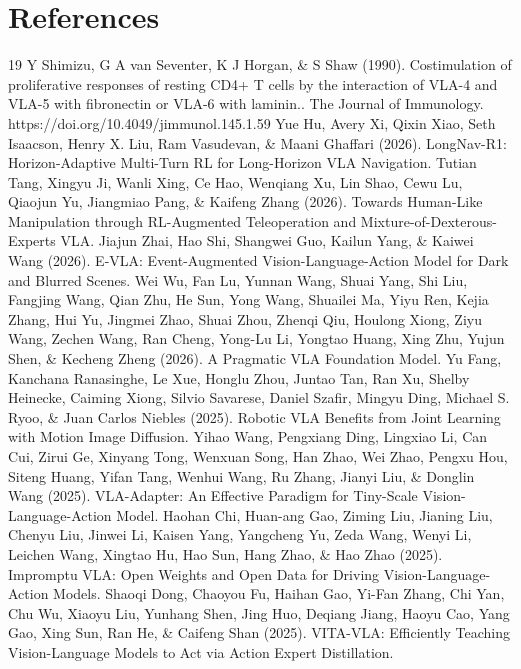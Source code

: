 \documentclass{article}
\begin{document}
\section*{References}
\begin{thebibliography}{19}
 Y Shimizu, G A van Seventer, K J Horgan, \& S Shaw (1990). Costimulation of proliferative responses of resting CD4+ T cells by the interaction of VLA-4 and VLA-5 with fibronectin or VLA-6 with laminin.. The Journal of Immunology. https://doi.org/10.4049/jimmunol.145.1.59
 Yue Hu, Avery Xi, Qixin Xiao, Seth Isaacson, Henry X. Liu, Ram Vasudevan, \& Maani Ghaffari (2026). LongNav-R1: Horizon-Adaptive Multi-Turn RL for Long-Horizon VLA Navigation.
 Tutian Tang, Xingyu Ji, Wanli Xing, Ce Hao, Wenqiang Xu, Lin Shao, Cewu Lu, Qiaojun Yu, Jiangmiao Pang, \& Kaifeng Zhang (2026). Towards Human-Like Manipulation through RL-Augmented Teleoperation and Mixture-of-Dexterous-Experts VLA.
 Jiajun Zhai, Hao Shi, Shangwei Guo, Kailun Yang, \& Kaiwei Wang (2026). E-VLA: Event-Augmented Vision-Language-Action Model for Dark and Blurred Scenes.
 Wei Wu, Fan Lu, Yunnan Wang, Shuai Yang, Shi Liu, Fangjing Wang, Qian Zhu, He Sun, Yong Wang, Shuailei Ma, Yiyu Ren, Kejia Zhang, Hui Yu, Jingmei Zhao, Shuai Zhou, Zhenqi Qiu, Houlong Xiong, Ziyu Wang, Zechen Wang, Ran Cheng, Yong-Lu Li, Yongtao Huang, Xing Zhu, Yujun Shen, \& Kecheng Zheng (2026). A Pragmatic VLA Foundation Model.
 Yu Fang, Kanchana Ranasinghe, Le Xue, Honglu Zhou, Juntao Tan, Ran Xu, Shelby Heinecke, Caiming Xiong, Silvio Savarese, Daniel Szafir, Mingyu Ding, Michael S. Ryoo, \& Juan Carlos Niebles (2025). Robotic VLA Benefits from Joint Learning with Motion Image Diffusion.
 Yihao Wang, Pengxiang Ding, Lingxiao Li, Can Cui, Zirui Ge, Xinyang Tong, Wenxuan Song, Han Zhao, Wei Zhao, Pengxu Hou, Siteng Huang, Yifan Tang, Wenhui Wang, Ru Zhang, Jianyi Liu, \& Donglin Wang (2025). VLA-Adapter: An Effective Paradigm for Tiny-Scale Vision-Language-Action Model.
 Haohan Chi, Huan-ang Gao, Ziming Liu, Jianing Liu, Chenyu Liu, Jinwei Li, Kaisen Yang, Yangcheng Yu, Zeda Wang, Wenyi Li, Leichen Wang, Xingtao Hu, Hao Sun, Hang Zhao, \& Hao Zhao (2025). Impromptu VLA: Open Weights and Open Data for Driving Vision-Language-Action Models.
 Shaoqi Dong, Chaoyou Fu, Haihan Gao, Yi-Fan Zhang, Chi Yan, Chu Wu, Xiaoyu Liu, Yunhang Shen, Jing Huo, Deqiang Jiang, Haoyu Cao, Yang Gao, Xing Sun, Ran He, \& Caifeng Shan (2025). VITA-VLA: Efficiently Teaching Vision-Language Models to Act via Action Expert Distillation.

\end{thebibliography}
\end{document}
